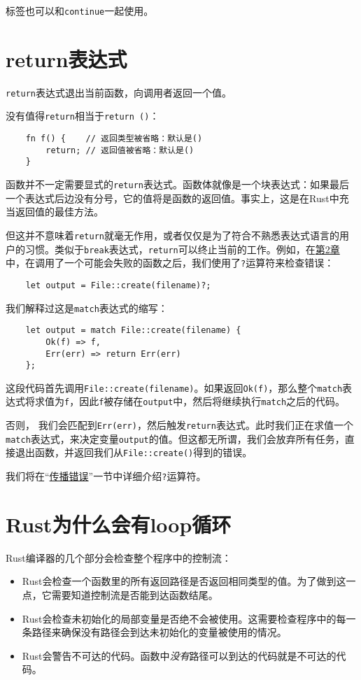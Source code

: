 标签也可以和\texttt{continue}一起使用。

\section{return表达式}
\texttt{return}表达式退出当前函数，向调用者返回一个值。

没有值得\texttt{return}相当于\texttt{return ()}：
\begin{verbatim}
    fn f() {    // 返回类型被省略：默认是()
        return; // 返回值被省略：默认是()
    }
\end{verbatim}

函数并不一定需要显式的\texttt{return}表达式。函数体就像是一个块表达式：如果最后一个表达式后边没有分号，它的值将是函数的返回值。事实上，这是在Rust中充当返回值的最佳方法。

但这并不意味着\texttt{return}就毫无作用，或者仅仅是为了符合不熟悉表达式语言的用户的习惯。类似于\texttt{break}表达式，\texttt{return}可以终止当前的工作。例如，在\hyperref[ch02]{第2章}中，在调用了一个可能会失败的函数之后，我们使用了\texttt{?}运算符来检查错误：
\begin{verbatim}
    let output = File::create(filename)?;
\end{verbatim}

我们解释过这是\texttt{match}表达式的缩写：
\begin{verbatim}
    let output = match File::create(filename) {
        Ok(f) => f,
        Err(err) => return Err(err)
    };
\end{verbatim}

这段代码首先调用\texttt{File::create(filename)}。如果返回\texttt{Ok(f)}，那么整个\texttt{match}表达式将求值为\texttt{f}，因此\texttt{f}被存储在\texttt{output}中，然后将继续执行\texttt{match}之后的代码。

否则， 我们会匹配到\texttt{Err(err)}，然后触发\texttt{return}表达式。此时我们正在求值一个\texttt{match}表达式，来决定变量\texttt{output}的值。但这都无所谓，我们会放弃所有任务，直接退出函数，并返回我们从\texttt{File::create()}得到的错误。

我们将在“\hyperref[properror]{传播错误}”一节中详细介绍\texttt{?}运算符。

\section{Rust为什么会有loop循环}

Rust编译器的几个部分会检查整个程序中的控制流：
\begin{itemize}
    \item Rust会检查一个函数里的所有返回路径是否返回相同类型的值。为了做到这一点，它需要知道控制流是否能到达函数结尾。
    \item Rust会检查未初始化的局部变量是否绝不会被使用。这需要检查程序中的每一条路径来确保没有路径会到达未初始化的变量被使用的情况。
    \item Rust会警告不可达的代码。函数中\emph{没有}路径可以到达的代码就是不可达的代码。
\end{itemize}

